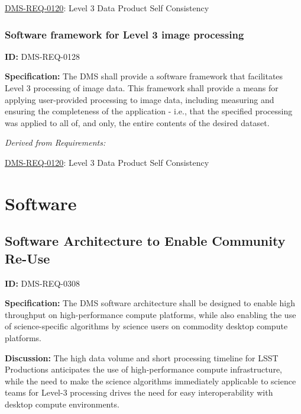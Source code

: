 \documentclass[SE,toc,lsstdraft]{lsstdoc}
\begin{document}
\hyperref[DMS-REQ-0120]{DMS-REQ-0120}:
Level 3 Data Product Self Consistency \newline


\subsubsection{Software framework for Level 3 image processing}

\label{DMS-REQ-0128}
\textbf{ID:} DMS-REQ-0128

\textbf{Specification:} The DMS shall provide a software framework that facilitates Level 3 processing of image data.  This framework shall provide a means for applying user-provided processing to image data, including measuring and ensuring the completeness of the application - i.e., that the specified processing was applied to all of, and only, the entire contents of the desired dataset.






\emph{Derived from Requirements:}

\hyperref[DMS-REQ-0120]{DMS-REQ-0120}:
Level 3 Data Product Self Consistency \newline


\section{Software}





\subsection{Software Architecture to Enable Community Re-Use}

\label{DMS-REQ-0308}
\textbf{ID:} DMS-REQ-0308

\textbf{Specification:} The DMS software architecture shall be designed to enable high throughput on high-performance compute platforms, while also enabling the use of science-specific algorithms by science users on commodity desktop compute platforms.

\textbf{Discussion: }The high data volume and short processing timeline for LSST Productions anticipates the use of high-performance compute infrastructure, while the need to make the science algorithms immediately applicable to science teams for Level-3 processing drives the need for easy interoperability with desktop compute environments.
\end{document}
